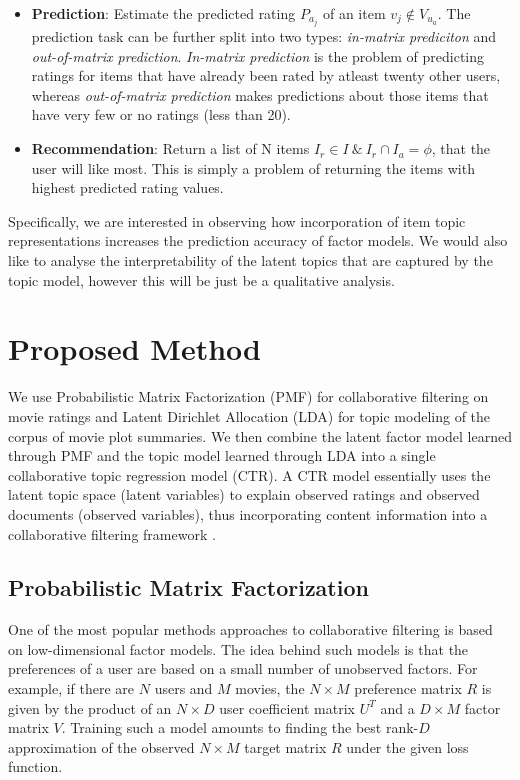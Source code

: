 \documentclass{article} %
\begin{document}
\begin{itemize}[leftmargin=*]

\item[] {\bf Prediction}: Estimate the predicted rating $P_{a_{j}}$ of an
item $v_{j} \notin V_{u_{a}}$. The prediction task can be further split into
two types: \textit{in-matrix prediciton} and \textit{out-of-matrix prediction}. 
\textit{In-matrix prediction} is the problem of predicting ratings for items
that have already been rated by atleast twenty other users, whereas 
\textit{out-of-matrix prediction} makes predictions about those items that have
very few or no ratings (less than 20).

\item[] {\bf Recommendation}: Return a list of N items $I_{r} \in I \:\&\: I_{r} \cap I_{a} = \phi$, that the user will like most. This is simply a problem of
returning the items with highest predicted rating values.

\end{itemize}

Specifically, we are interested in observing how incorporation of item topic 
representations increases the prediction accuracy of factor models. We would
also like to analyse the interpretability of the latent topics that are 
captured by the topic model, however this will be just be a qualitative 
analysis.

\section{Proposed Method}
\label{gen_inst}

We use Probabilistic Matrix Factorization (PMF) for collaborative filtering on 
movie ratings and Latent Dirichlet Allocation (LDA) for topic modeling of the 
corpus of movie plot summaries. We then combine the latent factor model learned
through PMF and the topic model learned through LDA into a single
collaborative topic regression model (CTR). A CTR model essentially uses the
latent topic space (latent variables) to explain observed ratings and observed 
documents (observed variables), thus incorporating content information into a 
collaborative filtering framework \cite{ctr}.

\subsection{Probabilistic Matrix Factorization}

One of the most popular methods approaches to collaborative filtering is based
on low-dimensional factor models. The idea behind such models is that the preferences of a user are based on a small number of unobserved factors. For example, if there are $N$ users and $M$ movies, the $N \times M$ preference matrix $R$ is given by the product of an $N \times D$ user coefficient matrix $U^T$ and a $D \times M$ factor matrix $V$. Training such a model amounts to finding the best rank-$D$ approximation of the observed $N \times M$ target matrix $R$ under the given loss function.
\end{document}
